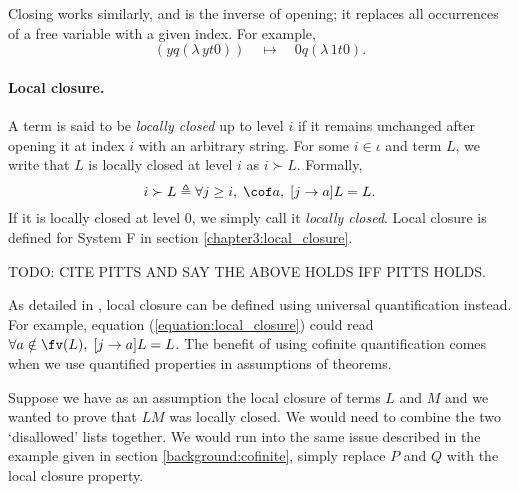 Closing works similarly, and is the inverse of opening; it replaces all occurrences of a free
variable with a given index. For example,
\begin{equation*}
  [0 \leftarrow y] (y q (\lambda \, y t 0)) \quad \mapsto \quad 0 q (\lambda \, 1 t 0).
\end{equation*}

\paragraph*{Local closure.} A term is said to be \textit{locally closed} up to level $i$ if it
remains unchanged after opening it at index $i$ with an arbitrary string. For some $i \in \iota$ and
term $L$, we write that $L$ is locally closed at level $i$ as $i \succ L$. Formally,
\begin{equation}
  \label{equation:local_closure}
  i \succ L \triangleq \forall j \geq i, \; \cof a , \; [j \to a] L = L.
\end{equation}
If it is locally closed at level $0$, we simply call it \textit{locally closed}. Local closure is
defined for System F in section \ref{chapter3:local_closure}.

TODO: CITE PITTS AND SAY THE ABOVE HOLDS IFF PITTS HOLDS.

As detailed in \citet{aydemir_engineering_2008}, local closure can be defined using universal
quantification instead. For example, equation (\ref{equation:local_closure}) could read $\forall a
\notin \fv(L), \; [j \to a] L = L$. The benefit of using cofinite quantification comes when we use
quantified properties in assumptions of theorems.

Suppose we have as an assumption the local closure of terms $L$ and $M$ and we wanted to prove that
$LM$ was locally closed. We would need to combine the two `disallowed' lists together. We would run
into the same issue described in the example given in section \ref{background:cofinite}, simply
replace $P$ and $Q$ with the local closure property.
